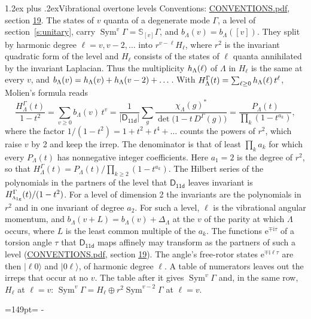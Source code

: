 \documentclass[10pt,a4paper]{article}
\makeatletter
\renewcommand\section{\@startsection{section}{1}{\z@}{-3ex plus -1ex minus -.2ex}%
  {1.2ex plus .2ex}{\normalfont\large\sffamily\bfseries\color{parttitle}}}
\newcommand{\needspace}[1]{\par\penalty-100\begingroup\dimen0=#1\relax\dimen2=\pagegoal
  \advance\dimen2-\pagetotal\ifdim\dimen0>\dimen2\relax\ifdim\dimen2>0pt\vfil\break\fi\fi
  \endgroup}
\numberwithin{equation}{section}
\newcommand{\grp}[1]{\mathsf{#1}}
\newcommand{\irr}[1]{\text{\normalfont\scshape #1}}
\newcommand{\ptag}[1]{\mathrm{#1}}
\newcommand{\iunit}{\mathrm{i}}
\newcommand{\expe}{\mathrm{e}}
\newcommand{\repD}[1]{D^{#1}}
\newcommand{\irchar}[1]{\chi_{#1}}
\newcommand{\conj}[1]{{#1}^{*}}
\newcommand{\schur}[1]{\mathbb{S}_{#1}}
\newcommand{\shape}[1]{[#1]}
\newcommand{\occ}[1]{\lvert #1\rangle}
\makeatother
\begin{document}
\section{Vibrational overtone levels}\label{s:overtones}
Conventions: \href{../../CONVENTIONS.pdf}{CONVENTIONS.pdf}, section \href{../../CONVENTIONS.pdf\#conv.19}{19}.
\leavevmode\label{n:index.quanta}\label{n:operator.symmetric.power}The states of $v$ quanta of a degenerate mode $\Gamma$, a level of section~\ref{s:unitary}, carry $\operatorname{Sym}^{v}\Gamma = \schur{\shape{v}}\Gamma$, and $b_\Lambda(v) = b_\Lambda(\shape{v})$. \label{n:local.quadratic.form}\label{n:set.harmonic}They split by harmonic degree $\ell = v, v - 2, \dots$ into $r^{v-\ell}H_\ell$, where $r^2$ is the invariant quadratic form of the level and $H_\ell$ consists of the states of $\ell$ quanta annihilated by the invariant Laplacian. \label{n:function.multiplicity.harmonic}Thus the multiplicity $\mathnormal{h}_\Lambda(\ell)$ of $\Lambda$ in $H_\ell$ is the same at every $v$, and $b_\Lambda(v) = \mathnormal{h}_\Lambda(v) + \mathnormal{h}_\Lambda(v - 2) + \dots$. \label{n:function.generating.level}With $H^{\Gamma}_\Lambda(t) = \sum_{\ell\ge0} \mathnormal{h}_\Lambda(\ell)\,t^{\ell}$, Molien's formula reads
\begin{equation}\label{e:molien}\frac{H^{\Gamma}_\Lambda(t)}{1 - t^2} = \sum_{v\ge0} b_\Lambda(v)\,t^v = \frac{1}{|\grp{D_{11d}}|}\sum_{g}\frac{\conj{\irchar{\Lambda}(g)}}{\det\bigl(1 - t\,\repD{\Gamma}(g)\bigr)} = \frac{P_\Lambda(t)}{\prod_k (1-t^{a_k})},\end{equation}
where the factor $1/(1 - t^2) = 1 + t^2 + t^4 + \dots$ counts the powers of $r^2$, which raise $v$ by 2 and keep the irrep. The denominator is that of least $\prod_k a_k$ for which every $P_\Lambda(t)$ has nonnegative integer coefficients. Here $a_1 = 2$ is the degree of $r^2$, so that $H^{\Gamma}_\Lambda(t) = P_\Lambda(t)/\prod_{k\ge2}(1 - t^{a_k})$. The Hilbert series of the polynomials in the partners of the level that $\grp{D_{11d}}$ leaves invariant is $H^{\Gamma}_{\irr{a}_{1\ptag{g}}}(t)/(1 - t^2)$. For a level of dimension 2 the invariants are the polynomials in $r^2$ and in one invariant of degree $a_2$. \label{n:index.overtone.period}\label{n:index.increment.unitary}For such a level, $\ell$ is the vibrational angular momentum, and $b_\Lambda(v + L) = b_\Lambda(v) + \Delta_\Lambda$ at the $v$ of the parity at which $\Lambda$ occurs, where $L$ is the least common multiple of the $a_k$. \label{n:local.torsion.angle}The functions $\expe^{\mp\iunit\tau}$ of a torsion angle $\tau$ that $\grp{D_{11d}}$ maps affinely may transform as the partners of such a level (\href{../../CONVENTIONS.pdf}{CONVENTIONS.pdf}, section \href{../../CONVENTIONS.pdf\#conv.19}{19}). The angle's free-rotor states $\expe^{\mp\iunit\ell\tau}$ are then $\occ{\ell 0}$ and $\occ{0 \ell}$, of harmonic degree $\ell$. A table of numerators leaves out the irreps that occur at no $v$. The table after it gives $\operatorname{Sym}^{v}\Gamma$ and, in the same row, $H_\ell$ at $\ell = v$: $\operatorname{Sym}^{v}\Gamma = H_\ell \oplus r^2\operatorname{Sym}^{v-2}\Gamma$ at $\ell = v$.
\needspace{149pt}
\end{document}
